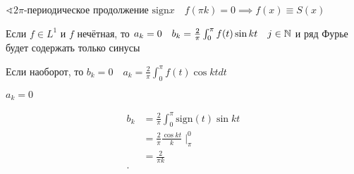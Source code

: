 \begin{example}
    $\sphericalangle 2\pi$-периодическое продолжение  $\mathrm{sign} x\quad f(\pi k) = 0 \implies f(x) \equiv S(x)$
\end{example}

\begin{note}
    Если $f\in L^1$ и $f$ нечётная, то $a_k = 0\quad b_k = \frac{2}{\pi}\int_0^\pi f(t)\sin kt\quad j\in \mathbb{N} $ и ряд Фурье будет содержать только синусы

    Если наоборот, то $b_k = 0\quad a_k = \frac{2}{\pi} \int_0^\pi f(t)\cos kt dt$
\end{note}

\begin{example}
    $a_k = 0$

    \begin{align*}
        b_k &= \frac{2}{\pi} \int_0^\pi \mathrm{sign}(t)\sin kt \\
        &= \frac{2}{\pi} \frac{\cos kt }{k}\mid _{\pi}^0 \\
        &= \frac{2}{\pi k} \\
    .\end{align*}
\end{example}




